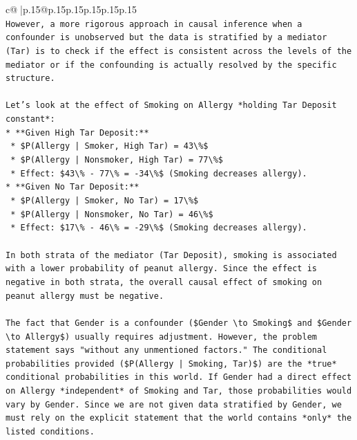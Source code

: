 \documentclass{article}
\begin{document}
{\begin{supertabular}{c@{$\;$}|p{.15\linewidth}@{}p{.15\linewidth}p{.15\linewidth}p{.15\linewidth}p{.15\linewidth}p{.15\linewidth}}
{{{\\ 
\texttt{However, a more rigorous approach in causal inference when a confounder is unobserved but the data is stratified by a mediator (Tar) is to check if the effect is consistent across the levels of the mediator or if the confounding is actually resolved by the specific structure.} \\
\\ 
\texttt{Let's look at the effect of Smoking on Allergy *holding Tar Deposit constant*:} \\
\texttt{*   **Given High Tar Deposit:**} \\
\texttt{    *   \$P(Allergy | Smoker, High Tar) = 43\textbackslash{}\%\$} \\
\texttt{    *   \$P(Allergy | Nonsmoker, High Tar) = 77\textbackslash{}\%\$} \\
\texttt{    *   Effect: \$43\textbackslash{}\% {-} 77\textbackslash{}\% = {-}34\textbackslash{}\%\$ (Smoking decreases allergy).} \\
\texttt{*   **Given No Tar Deposit:**} \\
\texttt{    *   \$P(Allergy | Smoker, No Tar) = 17\textbackslash{}\%\$} \\
\texttt{    *   \$P(Allergy | Nonsmoker, No Tar) = 46\textbackslash{}\%\$} \\
\texttt{    *   Effect: \$17\textbackslash{}\% {-} 46\textbackslash{}\% = {-}29\textbackslash{}\%\$ (Smoking decreases allergy).} \\
\\ 
\texttt{In both strata of the mediator (Tar Deposit), smoking is associated with a lower probability of peanut allergy. Since the effect is negative in both strata, the overall causal effect of smoking on peanut allergy must be negative.} \\
\\ 
\texttt{The fact that Gender is a confounder (\$Gender \textbackslash{}to Smoking\$ and \$Gender \textbackslash{}to Allergy\$) usually requires adjustment. However, the problem statement says "without any unmentioned factors." The conditional probabilities provided (\$P(Allergy | Smoking, Tar)\$) are the *true* conditional probabilities in this world. If Gender had a direct effect on Allergy *independent* of Smoking and Tar, those probabilities would vary by Gender. Since we are not given data stratified by Gender, we must rely on the explicit statement that the world contains *only* the listed conditions.} \\
\\ 
}}}
\end{supertabular}}
\end{document}
